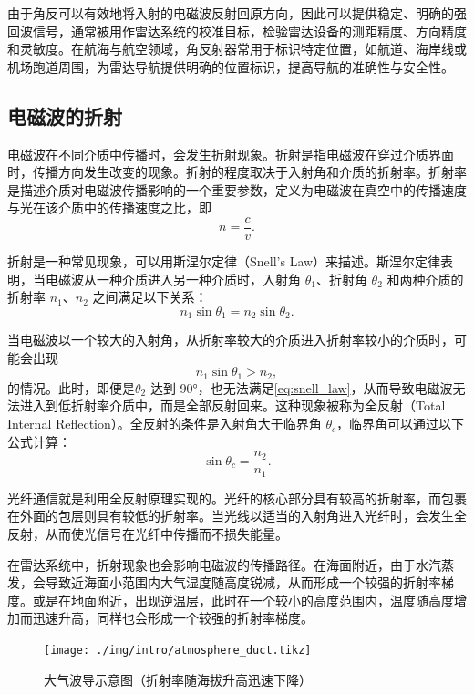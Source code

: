 由于角反可以有效地将入射的电磁波反射回原方向，因此可以提供稳定、明确的强回波信号，通常被用作雷达系统的校准目标，检验雷达设备的测距精度、方向精度和灵敏度。在航海与航空领域，角反射器常用于标识特定位置，如航道、海岸线或机场跑道周围，为雷达导航提供明确的位置标识，提高导航的准确性与安全性。

\subsection{电磁波的折射}

电磁波在不同介质中传播时，会发生折射现象。折射是指电磁波在穿过介质界面时，传播方向发生改变的现象。折射的程度取决于入射角和介质的折射率。折射率是描述介质对电磁波传播影响的一个重要参数，定义为电磁波在真空中的传播速度与光在该介质中的传播速度之比，即
\begin{equation}
    n = \frac{c}{v}.
    \label{eq:refraction_index}
\end{equation}

折射是一种常见现象，可以用斯涅尔定律（Snell's Law）来描述。斯涅尔定律表明，当电磁波从一种介质进入另一种介质时，入射角 $\theta_1$、折射角 $\theta_2$ 和两种介质的折射率 $n_1$、$n_2$ 之间满足以下关系：
\begin{equation}
    n_1 \sin \theta_1 = n_2 \sin \theta_2.
    \label{eq:snell_law}
\end{equation}

当电磁波以一个较大的入射角，从折射率较大的介质进入折射率较小的介质时，可能会出现
\[
    n_1 \sin \theta_1 > n_2,
\]
的情况。此时，即便是\( \theta_2 \) 达到 90°，也无法满足\cref{eq:snell_law}，从而导致电磁波无法进入到低折射率介质中，而是全部反射回来。这种现象被称为全反射（Total Internal Reflection）。全反射的条件是入射角大于临界角 $\theta_c$，临界角可以通过以下公式计算：
\begin{equation}
    \sin \theta_c = \frac{n_2}{n_1}.
    \label{eq:critical_angle}
\end{equation}

光纤通信就是利用全反射原理实现的。光纤的核心部分具有较高的折射率，而包裹在外面的包层则具有较低的折射率。当光线以适当的入射角进入光纤时，会发生全反射，从而使光信号在光纤中传播而不损失能量。

在雷达系统中，折射现象也会影响电磁波的传播路径。在海面附近，由于水汽蒸发，会导致近海面小范围内大气湿度随高度锐减，从而形成一个较强的折射率梯度。或是在地面附近，出现逆温层，此时在一个较小的高度范围内，温度随高度增加而迅速升高，同样也会形成一个较强的折射率梯度。

\begin{figure}[htb!]
    \centering
    \texttt{[image: ./img/intro/atmosphere\_duct.tikz]}
    \caption{大气波导示意图（折射率随海拔升高迅速下降）}
    \label{fig_chp1_atmosphere_duct}
\end{figure}

